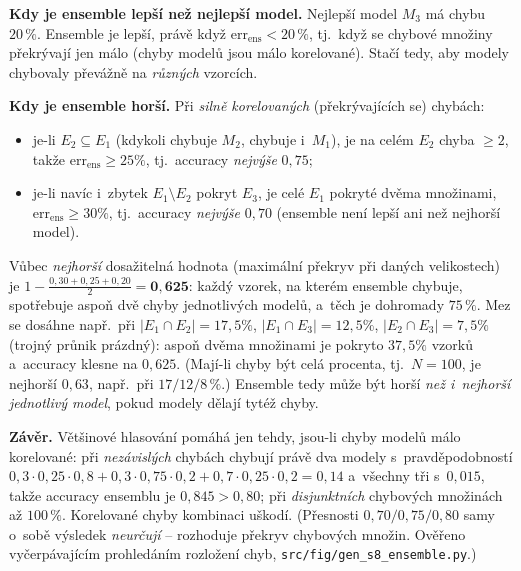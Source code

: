 \begin{priklad}
\textbf{Kdy je ensemble lepší než nejlepší model.} Nejlepší model $M_3$ má chybu $20\,\%$. Ensemble je lepší, právě když $\mathrm{err}_{\mathrm{ens}} < 20\,\%$, tj.\ když se chybové množiny překrývají jen málo (chyby modelů jsou málo korelované).
Stačí tedy, aby modely chybovaly převážně na \emph{různých} vzorcích.

\textbf{Kdy je ensemble horší.} Při \emph{silně korelovaných} (překrývajících se) chybách:
\begin{itemize}
  \item je-li $E_2\subseteq E_1$ (kdykoli chybuje $M_2$, chybuje i~$M_1$), je na celém $E_2$ chyba $\ge 2$, takže $\mathrm{err}_{\mathrm{ens}}\ge 25\%$, tj.\ accuracy \emph{nejvýše} $0{,}75$;
  \item je-li navíc i~zbytek $E_1\setminus E_2$ pokryt $E_3$, je celé $E_1$ pokryté dvěma množinami, $\mathrm{err}_{\mathrm{ens}}\ge 30\%$, tj.\ accuracy \emph{nejvýše} $0{,}70$ (ensemble není lepší ani než nejhorší model).
\end{itemize}
Vůbec \emph{nejhorší} dosažitelná hodnota (maximální překryv při daných velikostech) je $1-\tfrac{0{,}30+0{,}25+0{,}20}{2}=\mathbf{0{,}625}$: každý vzorek, na kterém ensemble chybuje, spotřebuje aspoň dvě chyby jednotlivých modelů, a~těch je dohromady $75\,\%$. Mez se dosáhne např.\ při $|E_1\cap E_2|=17{,}5\%$, $|E_1\cap E_3|=12{,}5\%$, $|E_2\cap E_3|=7{,}5\%$ (trojný průnik prázdný): aspoň dvěma množinami je pokryto $37{,}5\%$ vzorků a~accuracy klesne na $\boxed{0{,}625}$. (Mají-li chyby být celá procenta, tj.\ $N=100$, je nejhorší $0{,}63$, např.\ při $17/12/8\,\%$.) Ensemble tedy může být horší \emph{než i~nejhorší jednotlivý model}, pokud modely dělají tytéž chyby.

\smallskip
\noindent\textbf{Závěr.} Většinové hlasování pomáhá jen tehdy, jsou-li chyby modelů málo korelované: při \emph{nezávislých} chybách chybují právě dva modely s~pravděpodobností $0{,}3\cdot0{,}25\cdot0{,}8+0{,}3\cdot0{,}75\cdot0{,}2+0{,}7\cdot0{,}25\cdot0{,}2=0{,}14$ a~všechny tři s~$0{,}015$, takže accuracy ensemblu je $0{,}845>0{,}80$; při \emph{disjunktních} chybových množinách až $100\,\%$. Korelované chyby kombinaci uškodí. (Přesnosti $0{,}70/0{,}75/0{,}80$ samy o~sobě výsledek \emph{neurčují} -- rozhoduje překryv chybových množin. Ověřeno vyčerpávajícím prohledáním rozložení chyb, \texttt{src/fig/gen\_s8\_ensemble.py}.)
\end{priklad}
